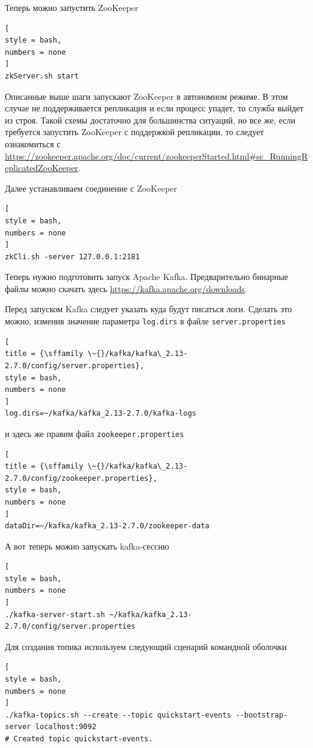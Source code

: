 \documentclass[%
	11pt,
	a4paper,
	utf8,
		]{article}
\begin{document}
Теперь можно запустить ZooKeeper
\begin{lstlisting}[
style = bash,
numbers = none	
]
zkServer.sh start 
\end{lstlisting}

Описанные выше шаги запускают ZooKeeper в автономном режиме. В этом случае не поддерживается репликация и если процесс упадет, то служба выйдет из строя. Такой схемы достаточно для большинства ситуаций, но все же, если требуется запустить ZooKeeper с поддержкой репликации, то следует ознакомиться с \url{https://zookeeper.apache.org/doc/current/zookeeperStarted.html#sc_RunningReplicatedZooKeeper}.

Далее устанавливаем соединение с ZooKeeper
\begin{lstlisting}[
style = bash,
numbers = none	
]
zkCli.sh -server 127.0.0.1:2181
\end{lstlisting}

Теперь нужно подготовить запуск Apache Kafka. Предварительно бинарные файлы можно скачать здесь \url{https://kafka.apache.org/downloads}.

Перед запуском Kafka следует указать куда будут писаться логи. Сделать это можно, изменив значение параметра \texttt{log.dirs} в файле \texttt{server.properties}
\begin{lstlisting}[
title = {\sffamily \~{}/kafka/kafka\_2.13-2.7.0/config/server.properties},
style = bash,
numbers = none
]
log.dirs=~/kafka/kafka_2.13-2.7.0/kafka-logs
\end{lstlisting}
и здесь же правим файл \texttt{zookeeper.properties}
\begin{lstlisting}[
title = {\sffamily \~{}/kafka/kafka\_2.13-2.7.0/config/zookeeper.properties},
style = bash,
numbers = none	
]
dataDir=~/kafka/kafka_2.13-2.7.0/zookeeper-data
\end{lstlisting}

А вот теперь можно запускать kafka-сессию
\begin{lstlisting}[
style = bash,
numbers = none	
]
./kafka-server-start.sh ~/kafka/kafka_2.13-2.7.0/config/server.properties
\end{lstlisting}

Для создания топика используем следующий сценарий командной оболочки
\begin{lstlisting}[
style = bash,
numbers = none	
]
./kafka-topics.sh --create --topic quickstart-events --bootstrap-server localhost:9092
# Created topic quickstart-events.
\end{lstlisting}
\end{document}
